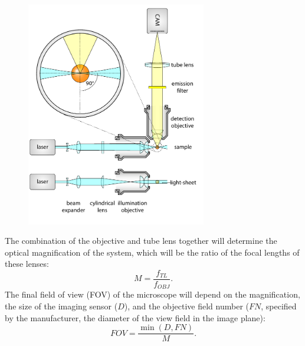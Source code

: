     \begin{figure}[tb]
      \centering
      \includegraphics[page=4,width=0.7\textwidth]{spim_cyl}
      \label{fig:wide-field}
    \end{figure}


    The combination of the objective and tube lens together will determine the optical magnification of the system, which will be the ratio of the focal lengths of these lenses:
    \begin{equation}
      M = \frac{f_{TL}}{f_{OBJ}}.
      \label{eq:magnification}
    \end{equation}
    The final field of view (FOV) of the microscope will depend on the magnification, the size of the imaging sensor ($D$), and the objective field number ($FN$, specified by the manufacturer, the diameter of the view field in the image plane):
    \begin{equation}
      FOV = \frac{\min(D, FN)}{M}.
      \label{eq:FOV}
    \end{equation}

